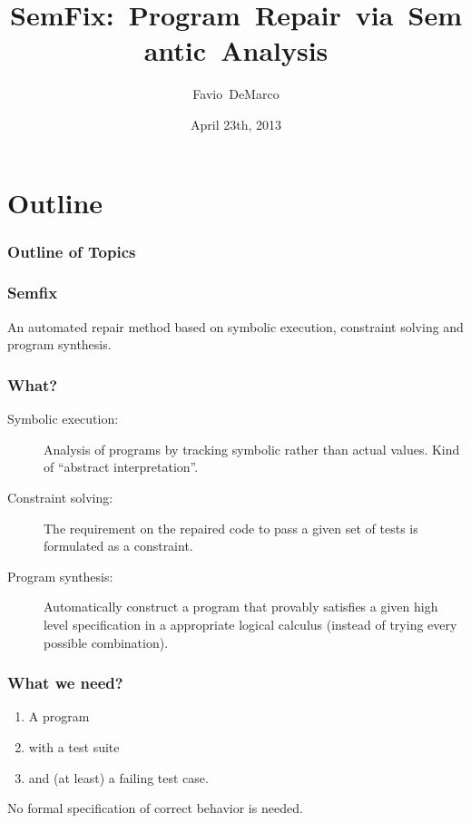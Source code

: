 \documentclass{beamer}
\title
  [SemFix: Program Repair via Semantic Analysis]
  {SemFix:~Program~Repair~via~Semantic~Analysis}
\author[DeMarco]{Favio~DeMarco}
\institute[U.B.A. - INRIA]{Universidad de Buenos Aires - INRIA}
\date[04/23/2013]{April 23th, 2013}
\begin{document}
\frame
  {
    \titlepage
  }
  \section*{Outline}
  \frame
  {
    \frametitle{Outline of Topics}

    \tableofcontents
  }
  
  \frame
  {
    \frametitle{Semfix}
	An automated repair method based on symbolic execution, constraint solving and program synthesis.
  }

  \frame
  {
    \frametitle{What?}
	\begin{description}
\item[Symbolic execution:] Analysis of programs by tracking symbolic rather than actual values. Kind of ``abstract interpretation''.

\item[Constraint solving:] The requirement on the repaired code to pass a given set of tests is formulated as a constraint.

\item[Program synthesis:] Automatically construct a program that provably satisfies a given high level specification in a appropriate logical calculus (instead of trying every possible combination).
	\end{description}
  }

  \frame
  {
    \frametitle{What we need?}
    \begin{enumerate}
     \item A program
     \item with a test suite
     \item and (at least) a failing test case.
    \end{enumerate}
      No formal specification of correct behavior is needed.
  }
\end{document}
